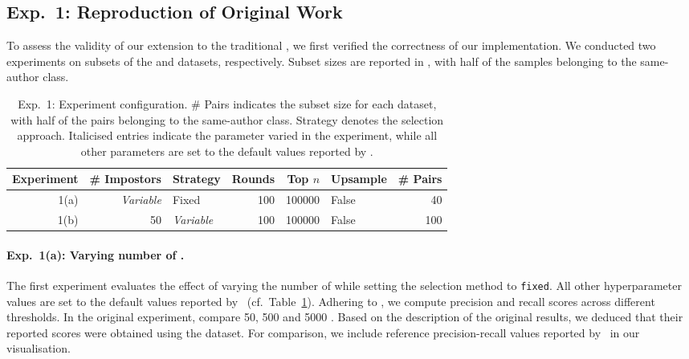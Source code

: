 \subsection{Exp.\ 1: Reproduction of Original Work}
\label{subsec:reproduction_setup}

To assess the validity of our extension to the traditional \impAppr{}, we first verified the correctness of our implementation. 
We conducted two experiments on subsets of the \dataBlog{} and \dataStudent{} datasets, respectively. Subset sizes are reported in , with half of the samples belonging to the same-author class.

\begin{table}[h]
\centering\small
\caption[Exp.\ 1: Experiment configuration]{Exp.\ 1: Experiment configuration.
\# Pairs indicates the subset size for each dataset, with half of the pairs belonging to the same-author class.
Strategy denotes the \imp{} selection approach.
Italicised entries indicate the parameter varied in the experiment, while all other parameters are set to the default values reported by \citet{koppel_determining_2014}.
}
\label{tab:config_exp1}
\begin{tabular}{@{}rrlrrlr@{}}   %
\toprule
Experiment & \# Impostors & Strategy & Rounds & Top $n$ & Upsample & \# Pairs \\
\midrule
1(a) & \textit{Variable} & Fixed & 100 & \num{100000} & False & 40 \\
1(b) & 50 & \textit{Variable} & 100 & \num{100000} & False & 100 \\
\bottomrule
\end{tabular}%
\end{table}

\paragraph{Exp.\ 1(a): Varying number of \imps{}.}
The first experiment evaluates the effect of varying the number of \imps{} while setting the \imp{} selection method to \texttt{fixed}.
All other hyperparameter values are set to the default values reported by \citet{koppel_determining_2014}\ (cf.~Table~\ref{tab:config_exp1}). 
Adhering to \citet{koppel_determining_2014}, we compute precision and recall scores across different thresholds.
In the original experiment, \citet{koppel_determining_2014} compare 50, 500 and \num{5000} \imps{}.
Based on the description of the original results, we deduced that their reported scores were obtained using the \dataBlog{} dataset.
For comparison, we include reference precision-recall values reported by \citet{koppel_determining_2014}\ in our visualisation.

